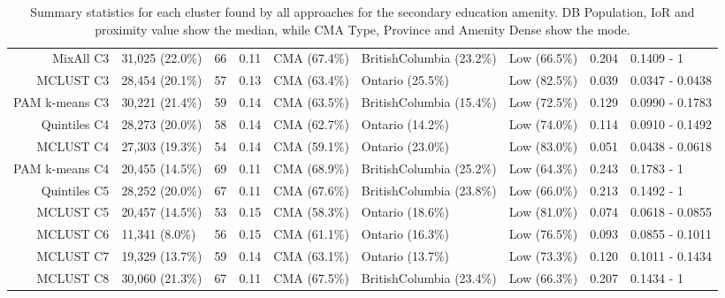 \documentclass[11pt, a4paper]{article}
\begin{document}
\begin{table}[H]
{\begin{tabular}{|r|llllllll|}
  MixAll C3 & 31,025 (22.0\%) & 66 & 0.11 & CMA (67.4\%) & BritishColumbia (23.2\%) & Low (66.5\%) & 0.204 & 0.1409 - 1 \\ 
  MCLUST C3 & 28,454 (20.1\%) & 57 & 0.13 & CMA (63.4\%) & Ontario (25.5\%) & Low (82.5\%) & 0.039 & 0.0347 - 0.0438 \\ 
  PAM k-means C3 & 30,221 (21.4\%) & 59 & 0.14 & CMA (63.5\%) & BritishColumbia (15.4\%) & Low (72.5\%) & 0.129 & 0.0990 - 0.1783 \\ 
  Quintiles C4 & 28,273 (20.0\%) & 58 & 0.14 & CMA (62.7\%) & Ontario (14.2\%) & Low (74.0\%) & 0.114 & 0.0910 - 0.1492 \\ 
  MCLUST C4 & 27,303 (19.3\%) & 54 & 0.14 & CMA (59.1\%) & Ontario (23.0\%) & Low (83.0\%) & 0.051 & 0.0438 - 0.0618 \\ 
  PAM k-means C4 & 20,455 (14.5\%) & 69 & 0.11 & CMA (68.9\%) & BritishColumbia (25.2\%) & Low (64.3\%) & 0.243 & 0.1783 - 1 \\ 
  Quintiles C5 & 28,252 (20.0\%) & 67 & 0.11 & CMA (67.6\%) & BritishColumbia (23.8\%) & Low (66.0\%) & 0.213 & 0.1492 - 1 \\ 
  MCLUST C5 & 20,457 (14.5\%) & 53 & 0.15 & CMA (58.3\%) & Ontario (18.6\%) & Low (81.0\%) & 0.074 & 0.0618 - 0.0855 \\ 
  MCLUST C6 & 11,341 (8.0\%) & 56 & 0.15 & CMA (61.1\%) & Ontario (16.3\%) & Low (76.5\%) & 0.093 & 0.0855 - 0.1011 \\ 
  MCLUST C7 & 19,329 (13.7\%) & 59 & 0.14 & CMA (63.1\%) & Ontario (13.7\%) & Low (73.3\%) & 0.120 & 0.1011 - 0.1434 \\ 
  MCLUST C8 & 30,060 (21.3\%) & 67 & 0.11 & CMA (67.5\%) & BritishColumbia (23.4\%) & Low (66.3\%) & 0.207 & 0.1434 - 1 \\ 
   \hline
\end{tabular}
}
\caption[Secondary education cluster profiles]{Summary statistics for each cluster found by all approaches for the secondary education amenity. DB Population, IoR and proximity value show the median, while CMA Type, Province and Amenity Dense show the mode.}\label{seceducprofiles}
\end{table}
\end{document}
